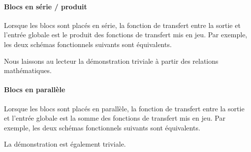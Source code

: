 \paragraph{Blocs en série / produit}
Lorsque les blocs sont placés en série, la fonction de transfert 
entre la sortie et l'entrée globale est le produit des fonctions de 
transfert mis en jeu. Par exemple, les deux schémas fonctionnels suivants 
sont équivalents.
\begin{center}

\end{center}
\begin{center}

\end{center}
Nous laissons au lecteur la démonstration triviale à partir des relations 
mathématiques.
\paragraph{Blocs en parallèle} 
Lorsque les blocs sont placés en parallèle, la fonction de transfert 
entre la sortie et l'entrée globale est la somme des fonctions de transfert 
mis en jeu. Par exemple, les deux schémas fonctionnels suivants 
sont équivalents.
\begin{center}
    
\end{center}
\begin{center}
    
\end{center}
La démonstration est également triviale.
\newpage
{}
\captionsetup{width=0.9\linewidth}
